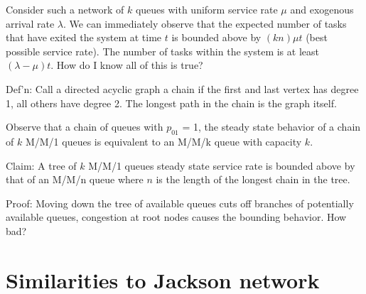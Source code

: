 \documentclass[]{article}
\begin{document}
Consider such a network of $k$ queues with uniform service rate $\mu$ and exogenous arrival rate $\lambda$. We can immediately observe that the expected number of tasks that have exited the system at time $t$ is bounded above by $(kn) \mu t$ (best possible service rate). The number of tasks within the system is at least $(\lambda - \mu)t$. How do I know all of this is true?

Def'n: Call a directed acyclic graph a chain if the first and last vertex has degree 1, all others have degree 2. The longest path in the chain is the graph itself.

Observe that a chain of queues with $p_01$ = 1, the steady state behavior of a chain of $k$ M/M/1 queues is equivalent to an M/M/k queue with capacity $k$. 

Claim: A tree of $k$ M/M/1 queues steady state service rate is bounded above by that of an M/M/n queue where $n$ is the length of the longest chain in the tree.

Proof: Moving down the tree of available queues cuts off branches of potentially available queues, congestion at root nodes causes the bounding behavior. How bad?

\section{Similarities to Jackson network}
\end{document}
